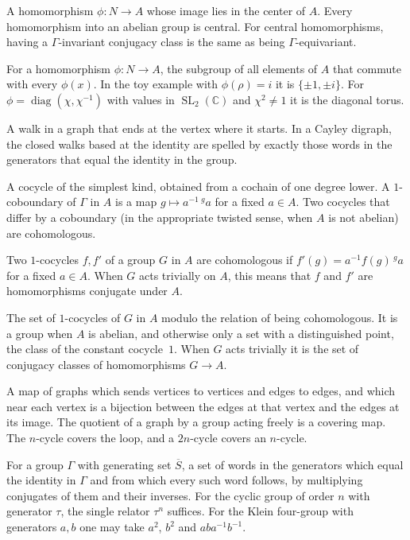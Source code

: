 \documentclass[12pt,letterpaper]{article}
\numberwithin{equation}{section}
\theoremstyle{plain}
\theoremstyle{definition}
\newcommand{\C}{\mathbb{C}}
\newcommand{\act}[2]{{}^{#1}\!#2}          %
\DeclareMathOperator{\SL}{SL}
\DeclareMathOperator{\diag}{diag}
\begin{document}
\begin{description}[itemsep=3pt,leftmargin=1.5em,style=unboxed]
\item[Central homomorphism.] A homomorphism $\phi:N\to A$ whose image lies
in the center of $A$. Every homomorphism into an abelian group is central.
For central homomorphisms, having a $\Gamma$-invariant conjugacy class is
the same as being $\Gamma$-equivariant.

\item[Centralizer $C_\phi$.] For a homomorphism $\phi:N\to A$, the
subgroup of all elements of $A$ that commute with every $\phi(x)$. In the
toy example with $\phi(\rho)=i$ it is $\{\pm1,\pm i\}$. For
$\phi=\diag(\chi,\chi^{-1})$ with values in $\SL_2(\C)$ and $\chi^2\neq1$
it is the diagonal torus.

\item[Closed walk.] A walk in a graph that ends at the vertex where it
starts. In a Cayley digraph, the closed walks based at the identity are
spelled by exactly those words in the generators that equal the identity
in the group.

\item[Coboundary.] A cocycle of the simplest kind, obtained from a
cochain of one degree lower. A $1$-coboundary of $\Gamma$ in $A$ is a map
$g\mapsto a^{-1}\,\act{g}{a}$ for a fixed $a\in A$. Two cocycles that
differ by a coboundary (in the appropriate twisted sense, when $A$ is not
abelian) are cohomologous.

\item[Cohomologous cocycles.] Two $1$-cocycles $f,f'$ of a group $G$ in
$A$ are cohomologous if $f'(g)=a^{-1}f(g)\,\act{g}{a}$ for a fixed
$a\in A$. When $G$ acts trivially on $A$, this means that $f$ and $f'$ are
homomorphisms conjugate under $A$.

\item[Cohomology set $H^1(G,A)$.] The set of $1$-cocycles of $G$ in $A$
modulo the relation of being cohomologous. It is a group when $A$ is
abelian, and otherwise only a set with a distinguished point, the class of
the constant cocycle~$1$. When $G$ acts trivially it is the set of
conjugacy classes of homomorphisms $G\to A$.

\item[Covering map of graphs.] A map of graphs which sends vertices to
vertices and edges to edges, and which near each vertex is a bijection
between the edges at that vertex and the edges at its image. The quotient
of a graph by a group acting freely is a covering map. The $n$-cycle
covers the loop, and a $2n$-cycle covers an $n$-cycle.

\item[Defining relators.] For a group $\Gamma$ with generating set
$\overline{S}$, a set of words in the generators which equal the identity
in $\Gamma$ and from which every such word follows, by multiplying
conjugates of them and their inverses. For the cyclic group of order $n$
with generator $\tau$, the single relator $\tau^n$ suffices. For the Klein
four-group with generators $a,b$ one may take $a^2$, $b^2$ and
$aba^{-1}b^{-1}$.


\end{description}
\end{document}
